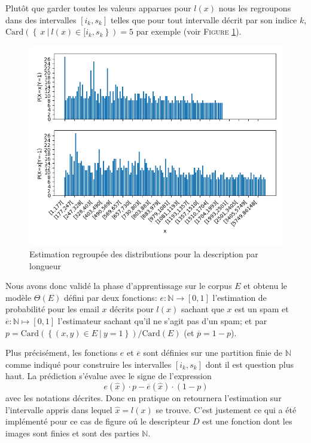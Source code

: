 \documentclass[a4paper, french]{article}
\begin{document}
Plut\^ot que garder toutes les valeurs apparues pour $l(x)$ nous les regroupons
dans des intervalles $[i_k,s_k]$ telles que pour tout intervalle d\'ecrit par
son indice $k$,
$\text{Card}\left(\left\{\ x\ |\ l(x)\in [i_k,s_k\right\}\right)=5$ par exemple
(voir F\textsc{igure} \ref{fig:histo5corpus}).

\begin{figure}[h!]
\begin{center}
    \caption{Estimation regroup\'ee des distributions pour la description par longueur}
    \label{fig:histo5corpus}
    \includegraphics[width=13cm]{histo5}
\end{center}
\end{figure}

\pagebreak
Nous avons donc valid\'e la phase d'apprentissage sur le corpus $E$ et obtenu
le mod\`ele $\Theta(E)$ d\'efini par deux fonctions:
$e\colon\mathbb{N}\rightarrow [0,1]$ l'estimation de probabilit\'e
pour les email $x$ d\'ecrits pour $l(x)$ sachant que $x$ est un spam
et $\overline{e}\colon\mathbb{N}\mapsto [0,1]$ l'estimateur sachant qu'il ne s'agit
pas d'un spam; et par $p=\text{Card}\left(\left\{(x,y)\in E\ |\ y=1\right\}\right)/%
\text{Card}(E)$ (et $\overline{p}=1-p$).

Plus pr\'ecis\'ement, les fonctions $e$ et $\overline{e}$ sont d\'efinies
sur une partition finie de $\mathbb{N}$ comme indiqu\'e
pour construire les intervalles $[i_k,s_k]$ dont il est question plus haut.
La pr\'ediction s'\'evalue avec le signe de l'expression
\begin{equation}
    e(\hat{x}) \cdot p - \overline{e}(\hat{x}) \cdot (1-p)
\end{equation}
avec les notations d\'ecrites. Donc en pratique on retournera l'estimation
sur l'intervalle appris dans lequel $\hat{x}=l(x)$ se trouve. C'est justement ce
qui a \'et\'e impl\'ement\'e pour ce cas de figure o\'u le descripteur $D$ est
une fonction dont les images sont finies et sont des parties $\mathbb{N}$.
\end{document}
